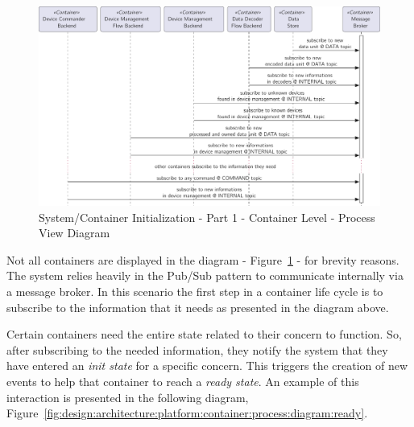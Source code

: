 \begin{figure}[H]
   \centering
   \includegraphics[page=1,width=\columnwidth]{assets/diagrams/design/architectural/level2/process/container-init.pdf}
   \caption[System/Container Initialization - Part 1 - Container Level - Process View Diagram]{System/Container Initialization - Part 1 - Container Level - Process View Diagram}
   \label{fig:design:architecture:platform:container:process:diagram:init}
\end{figure}

Not all containers are displayed in the diagram - Figure~\ref{fig:design:architecture:platform:container:process:diagram:init} - for brevity reasons.
The system relies heavily in the Pub/Sub \parencite{pubsub} pattern to communicate internally via a message broker. In this scenario the first step in a container life cycle is to subscribe to the information that it needs as presented in the diagram above.

Certain containers need the entire state related to their concern to function. So, after subscribing to the needed information, they notify the system that they have entered an \textit{init state} for a specific concern. This triggers the creation of new events to help that container to reach a \textit{ready state}. An example of this interaction is presented in the following diagram, Figure~\ref{fig:design:architecture:platform:container:process:diagram:ready}.

